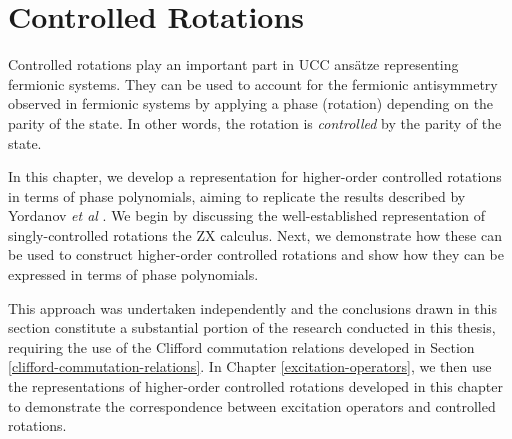 \chapter{Controlled Rotations}%
\label{controlled-rotations}

Controlled rotations play an important part in UCC ansätze representing fermionic systems. They can be used to account for the fermionic antisymmetry observed in fermionic systems by applying a phase (rotation) depending on the parity of the state. In other words, the rotation is \textit{controlled} by the parity of the state.

In this chapter, we develop a representation for higher-order controlled rotations in terms of phase polynomials, aiming to replicate the results described by Yordanov \textit{et al} \cite{Yordanov2020}. We begin by discussing the well-established representation of singly-controlled rotations the ZX calculus. Next, we demonstrate how these can be used to construct higher-order controlled rotations and show how they can be expressed in terms of phase polynomials.

This approach was undertaken independently and the conclusions drawn in this section constitute a substantial portion of the research conducted in this thesis, requiring the use of the Clifford commutation relations developed in Section \ref{clifford-commutation-relations}. In Chapter \ref{excitation-operators}, we then use the representations of higher-order controlled rotations developed in this chapter to demonstrate the correspondence between excitation operators and controlled rotations.
